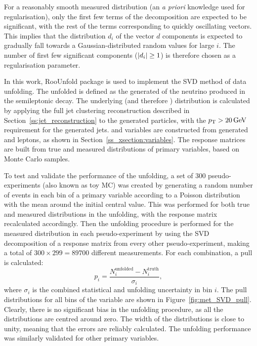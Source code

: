 For a reasonably smooth measured distribution (an \textit{a priori} knowledge used for regularisation), only the first
few terms of the decomposition are expected to be significant, with the rest of the terms corresponding to quickly
oscillating vectors. This implies that the distribution $d_i$ of the vector $d$ components is expected to gradually fall
towards a Gaussian-distributed random values for large $i$. The number of first few significant components ($\lvert d_i \rvert
\geq 1$) is therefore chosen as a regularisation parameter.

In this work, RooUnfold package \autocite{RooUnfold} is used to implement the SVD method of data unfolding. The unfolded
\MET is defined as the generated \pt of the neutrino produced in the semileptonic \ttbar decay. The underlying \HT (and
therefore \ST) distribution is calculated by applying the full jet clustering reconstruction described in
Section~\ref{ss:jet_reconstruction} to the generated particles, with the $\pt > \SI{20}{\GeV}$ requirement for the
generated jets. \MT and \WPT variables are constructed from generated \MET and leptons, as shown in
Section~\ref{ss_xsection:variables}. The response matrices are built from true and measured distributions of primary
variables, based on \ttbar Monte Carlo samples.

To test and validate the performance of the unfolding, a set of 300 pseudo-experiments (also known as toy MC) was
created by generating a random number of events in each bin of a primary variable according to a Poisson distribution
with the mean around the initial central value. This was performed for both true and measured distributions in the
unfolding, with the response matrix recalculated accordingly. Then the unfolding procedure is performed for the
measured distribution in each pseudo-experiment by using the SVD decomposition of a response matrix from every other
pseudo-experiment, making a total of $300 \times 299 = 89700$ different measurements. For each combination, a pull
is calculated:
\begin{equation}
p_i = \frac{N_i^{\text{unfolded}} -N_i^{\text{truth}} }{\sigma_i},
\end{equation}
where $\sigma_i$ is the combined statistical and unfolding uncertainty in bin $i$. The pull distributions for all bins
of the \MET variable are shown in Figure~\ref{fig:met_SVD_pull}. Clearly, there is no significant bias in the unfolding
procedure, as all the distributions are centred around zero. The width of the distributions is close to unity, meaning
that the errors are reliably calculated. The unfolding performance was similarly validated for other primary variables.

